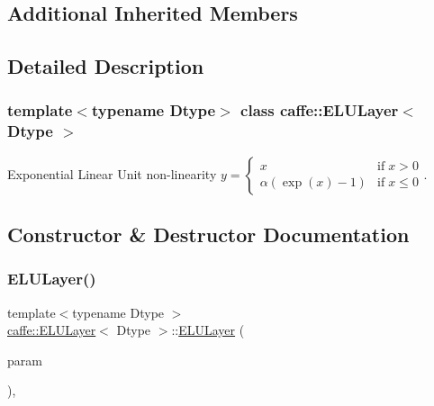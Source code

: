 \subsection*{Additional Inherited Members}


\subsection{Detailed Description}
\subsubsection*{template$<$typename Dtype$>$\newline
class caffe\+::\+E\+L\+U\+Layer$<$ Dtype $>$}

Exponential Linear Unit non-\/linearity $ y = \left\{ \begin{array}{lr} x & \mathrm{if} \; x > 0 \\ \alpha (\exp(x)-1) & \mathrm{if} \; x \le 0 \end{array} \right. $. ~\newline
 

\subsection{Constructor \& Destructor Documentation}
\mbox{\label{classcaffe_1_1_e_l_u_layer_af0b475c3d3b68f6daf7e2edcb7d5b97a}} 
\subsubsection{\texorpdfstring{E\+L\+U\+Layer()}{ELULayer()}\hspace{0.1cm}{\footnotesize\ttfamily [1/2]}}
{\footnotesize\ttfamily template$<$typename Dtype $>$ \\
\mbox{\hyperlink{classcaffe_1_1_e_l_u_layer}{caffe\+::\+E\+L\+U\+Layer}}$<$ Dtype $>$\+::\mbox{\hyperlink{classcaffe_1_1_e_l_u_layer}{E\+L\+U\+Layer}} (\begin{DoxyParamCaption}\item[{const \mbox{\hyperlink{classcaffe_1_1_layer_parameter}{Layer\+Parameter}} \&}]{param }\end{DoxyParamCaption})\hspace{0.3cm}{\ttfamily [inline]}, {\ttfamily [explicit]}}


